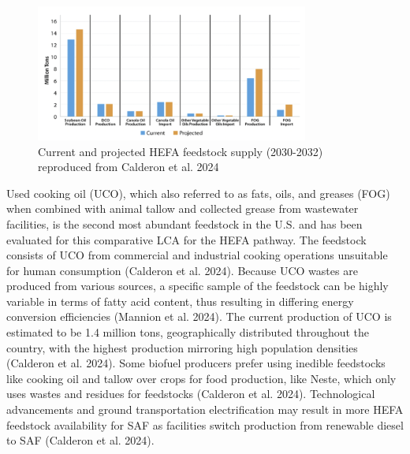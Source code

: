 \documentclass[12pt]{article}
\begin{document}
\begin{figure}[H]
\centering
\includegraphics[width=0.8\textwidth]{Figures/Fig 5.png} %
\caption{Current and projected HEFA feedstock supply (2030-2032) reproduced from Calderon et al. 2024}
\label{figure 5}
\end{figure}


Used cooking oil (UCO), which also referred to as fats, oils, and greases (FOG) when combined with animal tallow and collected grease from wastewater facilities, is the second most abundant feedstock in the U.S. and has been evaluated for this comparative LCA for the HEFA pathway. The feedstock consists of UCO from commercial and industrial cooking operations unsuitable for human consumption (Calderon et al. 2024). Because UCO wastes are produced from various sources, a specific sample of the feedstock can be highly variable in terms of fatty acid content, thus resulting in differing energy conversion efficiencies (Mannion et al. 2024). The current production of UCO is estimated to be 1.4 million tons, geographically distributed throughout the country, with the highest production mirroring high population densities (Calderon et al. 2024).  Some biofuel producers prefer using inedible feedstocks like cooking oil and tallow over crops for food production, like Neste, which only uses wastes and residues for feedstocks (Calderon et al. 2024). Technological advancements and ground transportation electrification may result in more HEFA feedstock availability for SAF as facilities switch production from renewable diesel to SAF (Calderon et al. 2024). 
\end{document}
